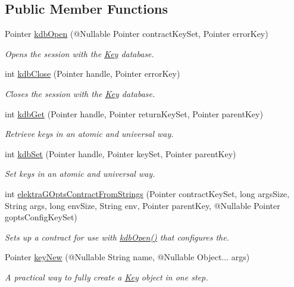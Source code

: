 \subsection*{Public Member Functions}
\begin{DoxyCompactItemize}
\item 
Pointer \hyperlink{interfaceorg_1_1libelektra_1_1Elektra_a32639cf92429fe65bf3744a007d8647f}{kdb\+Open} (@Nullable Pointer contract\+Key\+Set, Pointer error\+Key)
\begin{DoxyCompactList}\small\item\em Opens the session with the \hyperlink{classorg_1_1libelektra_1_1Key}{Key} database. \end{DoxyCompactList}\item 
int \hyperlink{interfaceorg_1_1libelektra_1_1Elektra_a60cf0c7cefd0a6a34b4608bdc5eded4b}{kdb\+Close} (Pointer handle, Pointer error\+Key)
\begin{DoxyCompactList}\small\item\em Closes the session with the \hyperlink{classorg_1_1libelektra_1_1Key}{Key} database. \end{DoxyCompactList}\item 
int \hyperlink{interfaceorg_1_1libelektra_1_1Elektra_a09ad2a446a215b6cce4cfb31d9871ac2}{kdb\+Get} (Pointer handle, Pointer return\+Key\+Set, Pointer parent\+Key)
\begin{DoxyCompactList}\small\item\em Retrieve keys in an atomic and universal way. \end{DoxyCompactList}\item 
int \hyperlink{interfaceorg_1_1libelektra_1_1Elektra_a7b69b22fd8b712891d188215707e0540}{kdb\+Set} (Pointer handle, Pointer key\+Set, Pointer parent\+Key)
\begin{DoxyCompactList}\small\item\em Set keys in an atomic and universal way. \end{DoxyCompactList}\item 
int \hyperlink{interfaceorg_1_1libelektra_1_1Elektra_aba251761ea3e25ba205df77f7729e1bf}{elektra\+G\+Opts\+Contract\+From\+Strings} (Pointer contract\+Key\+Set, long args\+Size, String args, long env\+Size, String env, Pointer parent\+Key, @Nullable Pointer gopts\+Config\+Key\+Set)
\begin{DoxyCompactList}\small\item\em Sets up a contract for use with \hyperlink{}{kdb\+Open()} that configures the. \end{DoxyCompactList}\item 
Pointer \hyperlink{interfaceorg_1_1libelektra_1_1Elektra_ae437441010a3a634a39107e37808cbd1}{key\+New} (@Nullable String name, @Nullable Object... args)
\begin{DoxyCompactList}\small\item\em A practical way to fully create a \hyperlink{classorg_1_1libelektra_1_1Key}{Key} object in one step. \end{DoxyCompactList}\end{DoxyCompactItemize}
